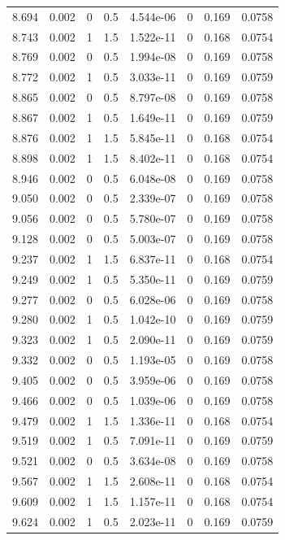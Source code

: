 \documentclass[preview]{standalone}
\begin{document}
{{{{{{\begin{tabular}{L{1.2cm}C{1.2cm} C{0.3cm}C{0.5cm} C{1.4cm}C{1.4cm} C{1.4cm}C{1.4cm}}
  8.694  &  0.002  & 0     & 0.5 &  4.544e-06  & 0  & 0.169 &  0.0758   \\ 
  8.743  &  0.002  & 1     & 1.5 &  1.522e-11  & 0  & 0.168 &  0.0754   \\ 
  8.769  &  0.002  & 0     & 0.5 &  1.994e-08  & 0  & 0.169 &  0.0758   \\ 
  8.772  &  0.002  & 1     & 0.5 &  3.033e-11  & 0  & 0.169 &  0.0759   \\ 
  8.865  &  0.002  & 0     & 0.5 &  8.797e-08  & 0  & 0.169 &  0.0758   \\ 
  8.867  &  0.002  & 1     & 0.5 &  1.649e-11  & 0  & 0.169 &  0.0759   \\ 
  8.876  &  0.002  & 1     & 1.5 &  5.845e-11  & 0  & 0.168 &  0.0754   \\ 
  8.898  &  0.002  & 1     & 1.5 &  8.402e-11  & 0  & 0.168 &  0.0754   \\ 
  8.946  &  0.002  & 0     & 0.5 &  6.048e-08  & 0  & 0.169 &  0.0758   \\ 
  9.050  &  0.002  & 0     & 0.5 &  2.339e-07  & 0  & 0.169 &  0.0758   \\ 
  9.056  &  0.002  & 0     & 0.5 &  5.780e-07  & 0  & 0.169 &  0.0758   \\ 
  9.128  &  0.002  & 0     & 0.5 &  5.003e-07  & 0  & 0.169 &  0.0758   \\ 
  9.237  &  0.002  & 1     & 1.5 &  6.837e-11  & 0  & 0.168 &  0.0754   \\ 
  9.249  &  0.002  & 1     & 0.5 &  5.350e-11  & 0  & 0.169 &  0.0759   \\ 
  9.277  &  0.002  & 0     & 0.5 &  6.028e-06  & 0  & 0.169 &  0.0758   \\ 
  9.280  &  0.002  & 1     & 0.5 &  1.042e-10  & 0  & 0.169 &  0.0759   \\ 
  9.323  &  0.002  & 1     & 0.5 &  2.090e-11  & 0  & 0.169 &  0.0759   \\ 
  9.332  &  0.002  & 0     & 0.5 &  1.193e-05  & 0  & 0.169 &  0.0758   \\ 
  9.405  &  0.002  & 0     & 0.5 &  3.959e-06  & 0  & 0.169 &  0.0758   \\ 
  9.466  &  0.002  & 0     & 0.5 &  1.039e-06  & 0  & 0.169 &  0.0758   \\ 
  9.479  &  0.002  & 1     & 1.5 &  1.336e-11  & 0  & 0.168 &  0.0754   \\ 
  9.519  &  0.002  & 1     & 0.5 &  7.091e-11  & 0  & 0.169 &  0.0759   \\ 
  9.521  &  0.002  & 0     & 0.5 &  3.634e-08  & 0  & 0.169 &  0.0758   \\ 
  9.567  &  0.002  & 1     & 1.5 &  2.608e-11  & 0  & 0.168 &  0.0754   \\ 
  9.609  &  0.002  & 1     & 1.5 &  1.157e-11  & 0  & 0.168 &  0.0754   \\ 
  9.624  &  0.002  & 1     & 0.5 &  2.023e-11  & 0  & 0.169 &  0.0759   \\ 
\hline 
\end{tabular} 

}}}}}}
\end{document}
